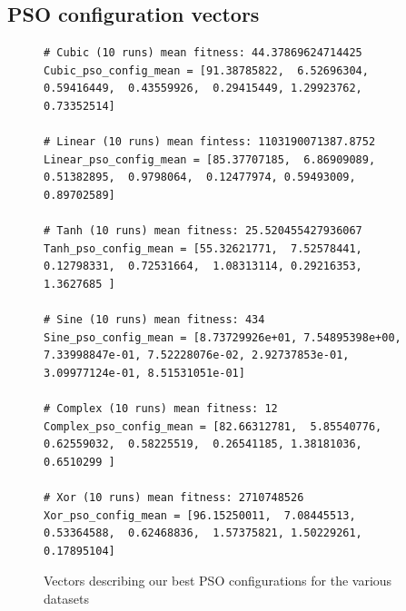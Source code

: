 \documentclass[12pt]{article}
\begin{document}
\subsection{PSO configuration vectors}\label{app:PSOconf}
\begin{figure}[h]
    \begin{verbatim}
# Cubic (10 runs) mean fitness: 44.37869624714425
Cubic_pso_config_mean = [91.38785822,  6.52696304,  0.59416449,  0.43559926,  0.29415449, 1.29923762,  0.73352514]

# Linear (10 runs) mean fintess: 1103190071387.8752
Linear_pso_config_mean = [85.37707185,  6.86909089,  0.51382895,  0.9798064,  0.12477974, 0.59493009,  0.89702589]

# Tanh (10 runs) mean fitness: 25.520455427936067
Tanh_pso_config_mean = [55.32621771,  7.52578441,  0.12798331,  0.72531664,  1.08313114, 0.29216353,  1.3627685 ]

# Sine (10 runs) mean fitness: 434
Sine_pso_config_mean = [8.73729926e+01, 7.54895398e+00, 7.33998847e-01, 7.52228076e-02, 2.92737853e-01, 3.09977124e-01, 8.51531051e-01]

# Complex (10 runs) mean fitness: 12
Complex_pso_config_mean = [82.66312781,  5.85540776,  0.62559032,  0.58225519,  0.26541185, 1.38181036,  0.6510299 ]

# Xor (10 runs) mean fitness: 2710748526
Xor_pso_config_mean = [96.15250011,  7.08445513,  0.53364588,  0.62468836,  1.57375821, 1.50229261,  0.17895104]

    \end{verbatim}
    \caption{Vectors describing our best PSO configurations for the various datasets}
    \label{minted:psoVec}
\end{figure}

\newpage
\end{document}
